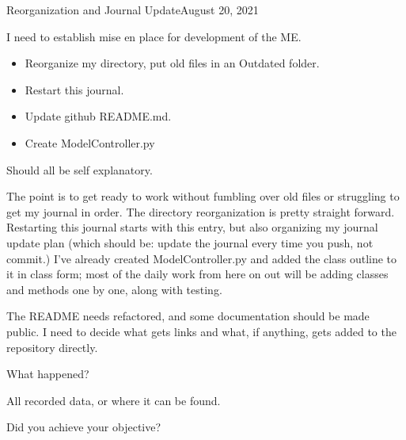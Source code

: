 \usepackage{hyperref}%
\begin{entry}{Reorganization and Journal Update}{August 20, 2021}
    \objective 
    
    I need to establish mise en place for development of the ME.
    \outline
    
    \begin{itemize}
        \item Reorganize my directory, put old files in an Outdated folder.
        \item Restart this journal.
        \item Update github README.md.
        \item Create ModelController.py
    \end{itemize}
    
    \procedures
    
    Should all be self explanatory.

    \parameters
    
    The point is to get ready to work without fumbling over old files or struggling to get my journal in order. The
    directory reorganization is pretty straight forward. Restarting this journal starts with this entry, but also
    organizing my journal update plan (which should be: update the journal every time you push, not commit.) I've
    already created ModelController.py and added the class outline to it in class form; most of the daily work from here
    on out will be adding classes and methods one by one, along with testing.

    The README needs refactored, and some documentation should be made public. I need to decide what gets links and
    what, if anything, gets added to the repository directly.
    
    \observations
    
    What happened?
    
    \data
    
    All recorded data, or where it can be found.
    
    \results
    
    Did you achieve your objective?
    
\end{entry}


